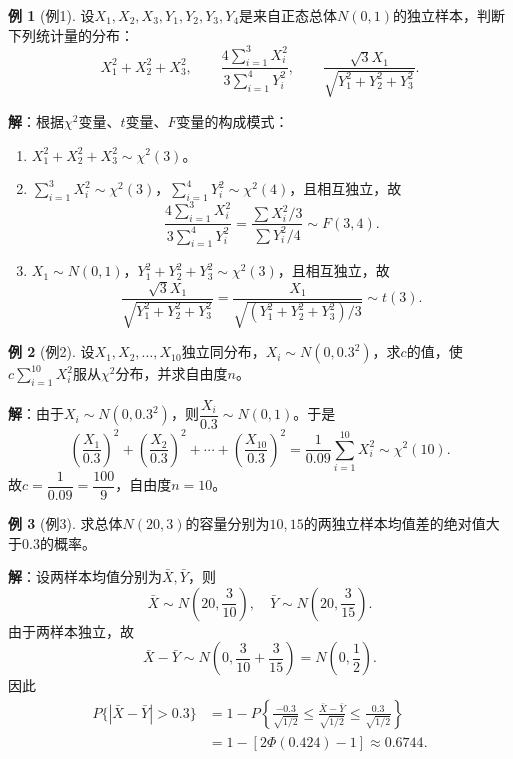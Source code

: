 \documentclass[11pt,a4paper]{report}
\theoremstyle{definition}
\newtheorem{example}{例}[chapter]
\theoremstyle{plain}
\begin{document}
\begin{example}[例1]
设$X_1,X_2,X_3,Y_1,Y_2,Y_3,Y_4$是来自正态总体$N(0,1)$的独立样本，判断下列统计量的分布：
\[
X_1^2+X_2^2+X_3^2,\qquad
\frac{4\sum_{i=1}^{3}X_i^2}{3\sum_{i=1}^{4}Y_i^2},\qquad
\frac{\sqrt{3}X_1}{\sqrt{Y_1^2+Y_2^2+Y_3^2}}.
\]

\textbf{解}：根据$\chi^2$变量、$t$变量、$F$变量的构成模式：
\begin{enumerate}[label=\arabic*.,leftmargin=2em]
    \item $X_1^2+X_2^2+X_3^2\sim\chi^2(3)$。
    \item $\sum_{i=1}^{3}X_i^2\sim\chi^2(3)$，$\sum_{i=1}^{4}Y_i^2\sim\chi^2(4)$，且相互独立，故
    \[
    \frac{4\sum_{i=1}^{3}X_i^2}{3\sum_{i=1}^{4}Y_i^2}
    =\frac{\sum X_i^2/3}{\sum Y_i^2/4}
    \sim F(3,4).
    \]
    \item $X_1\sim N(0,1)$，$Y_1^2+Y_2^2+Y_3^2\sim\chi^2(3)$，且相互独立，故
    \[
    \frac{\sqrt{3}X_1}{\sqrt{Y_1^2+Y_2^2+Y_3^2}}
    =\frac{X_1}{\sqrt{(Y_1^2+Y_2^2+Y_3^2)/3}}
    \sim t(3).
    \]
\end{enumerate}
\end{example}

\begin{example}[例2]
设$X_1,X_2,\ldots,X_{10}$独立同分布，$X_i\sim N(0,0.3^2)$，求$c$的值，使$c\sum_{i=1}^{10}X_i^2$服从$\chi^2$分布，并求自由度$n$。

\textbf{解}：由于$X_i\sim N(0,0.3^2)$，则$\dfrac{X_i}{0.3}\sim N(0,1)$。于是
\[
\left(\frac{X_1}{0.3}\right)^2+\left(\frac{X_2}{0.3}\right)^2+\cdots+\left(\frac{X_{10}}{0.3}\right)^2
=\frac{1}{0.09}\sum_{i=1}^{10}X_i^2
\sim\chi^2(10).
\]
故$c=\dfrac{1}{0.09}=\dfrac{100}{9}$，自由度$n=10$。
\end{example}

\begin{example}[例3]
求总体$N(20,3)$的容量分别为$10,15$的两独立样本均值差的绝对值大于$0.3$的概率。

\textbf{解}：设两样本均值分别为$\bar{X},\bar{Y}$，则
\[
\bar{X}\sim N\left(20,\frac{3}{10}\right),\quad
\bar{Y}\sim N\left(20,\frac{3}{15}\right).
\]
由于两样本独立，故
\[
\bar{X}-\bar{Y}\sim N\left(0,\frac{3}{10}+\frac{3}{15}\right)=N\left(0,\frac{1}{2}\right).
\]
因此
\[
\begin{aligned}
P\{|\bar{X}-\bar{Y}|>0.3\}
&=1-P\left\{\frac{-0.3}{\sqrt{1/2}}\leq\frac{\bar{X}-\bar{Y}}{\sqrt{1/2}}\leq\frac{0.3}{\sqrt{1/2}}\right\}\\
&=1-[2\Phi(0.424)-1]\approx 0.6744.
\end{aligned}
\]
\end{example}
\end{document}
